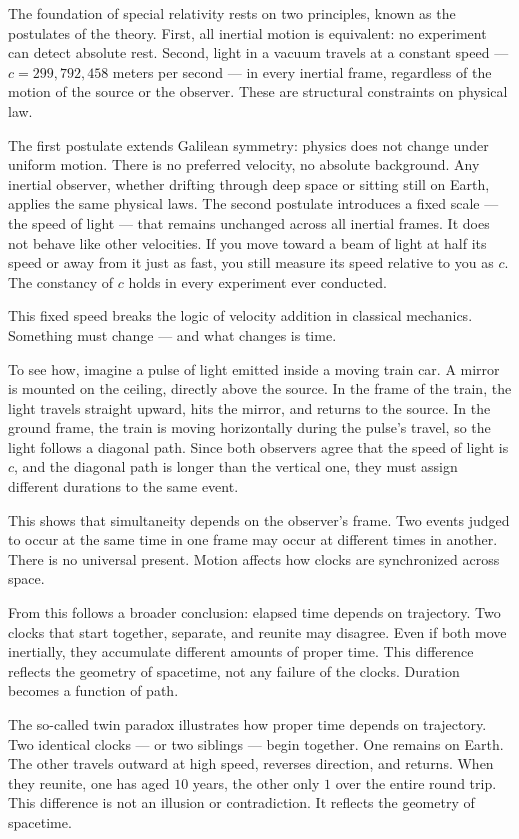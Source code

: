 The foundation of special relativity rests on two principles, known as the postulates of the theory. First, all inertial motion is equivalent: no experiment can detect absolute rest. Second, light in a vacuum travels at a constant speed — $c = 299{,}792{,}458$ meters per second — in every inertial frame, regardless of the motion of the source or the observer. These are structural constraints on physical law.

The first postulate extends Galilean symmetry: physics does not change under uniform motion. There is no preferred velocity, no absolute background. Any inertial observer, whether drifting through deep space or sitting still on Earth, applies the same physical laws. The second postulate introduces a fixed scale — the speed of light — that remains unchanged across all inertial frames. It does not behave like other velocities. If you move toward a beam of light at half its speed or away from it just as fast, you still measure its speed relative to you as $c$. The constancy of $c$ holds in every experiment ever conducted.

This fixed speed breaks the logic of velocity addition in classical mechanics. Something must change — and what changes is time.

To see how, imagine a pulse of light emitted inside a moving train car. A mirror is mounted on the ceiling, directly above the source. In the frame of the train, the light travels straight upward, hits the mirror, and returns to the source. In the ground frame, the train is moving horizontally during the pulse’s travel, so the light follows a diagonal path. Since both observers agree that the speed of light is $c$, and the diagonal path is longer than the vertical one, they must assign different durations to the same event.

This shows that simultaneity depends on the observer’s frame. Two events judged to occur at the same time in one frame may occur at different times in another. There is no universal present. Motion affects how clocks are synchronized across space.

From this follows a broader conclusion: elapsed time depends on trajectory. Two clocks that start together, separate, and reunite may disagree. Even if both move inertially, they accumulate different amounts of proper time. This difference reflects the geometry of spacetime, not any failure of the clocks. Duration becomes a function of path.


The so-called twin paradox illustrates how proper time depends on trajectory. Two identical clocks — or two siblings — begin together. One remains on Earth. The other travels outward at high speed, reverses direction, and returns. When they reunite, one has aged $10$ years, the other only $1$ over the entire round trip. This difference is not an illusion or contradiction. It reflects the geometry of spacetime.

